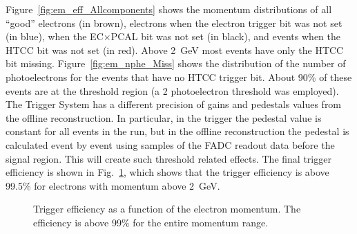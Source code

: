 Figure~\ref{fig:em_eff_Allcomponents} shows the momentum distributions of all ``good'' electrons (in brown),
electrons when the electron trigger bit was not set  (in blue), when the EC$\times$PCAL bit was not set (in black),
and events when the HTCC bit was not set (in red). Above 2~GeV most events have only the HTCC bit missing.
Figure~\ref{fig:em_nphe_Miss} shows the distribution of the number of photoelectrons for the events that
have no HTCC trigger bit. About 90\% of these events are at the threshold region (a 2 photoelectron threshold
was employed). The Trigger System has a different precision of gains and pedestals values from the offline
reconstruction. In particular, in the trigger the pedestal value is constant for all events in the run, but in the
offline reconstruction the pedestal is calculated event by event using samples of the FADC readout data before
the signal region. This will create  such threshold related effects. The final trigger efficiency is shown in
Fig.~\ref{fig:em_eff}, which shows that  the trigger efficiency is above 99.5\% for electrons with momentum
above 2~GeV.

\begin{figure}[!htb]
 \centering
 \caption{Trigger efficiency as a function of the electron momentum. The efficiency is above 99\% for the
   entire momentum range.}
 \label{fig:em_eff}
\end{figure}


